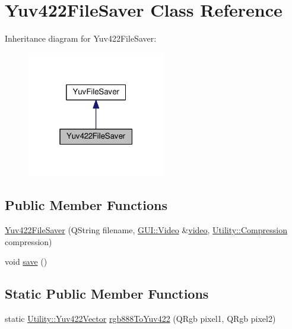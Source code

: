 \hypertarget{classUtility_1_1Yuv422FileSaver}{}\section{Yuv422\+File\+Saver Class Reference}
\label{classUtility_1_1Yuv422FileSaver}


Inheritance diagram for Yuv422\+File\+Saver\+:
\nopagebreak
\begin{figure}[H]
\begin{center}
\leavevmode
\includegraphics[width=171pt]{classUtility_1_1Yuv422FileSaver__inherit__graph}
\end{center}
\end{figure}
\subsection*{Public Member Functions}
\begin{DoxyCompactItemize}
\item 
\hyperlink{classUtility_1_1Yuv422FileSaver_a8028e1804a4e783e7935f005836bd11a}{Yuv422\+File\+Saver} (Q\+String filename, \hyperlink{classGUI_1_1Video}{G\+U\+I\+::\+Video} \&\hyperlink{classUtility_1_1YuvFileSaver_a1c4d4daa00ecea5e8390244e057da0df}{video}, \hyperlink{namespaceUtility_a56a83bf6847f4801f4205eb4be237ccf}{Utility\+::\+Compression} compression)
\item 
void \hyperlink{classUtility_1_1Yuv422FileSaver_aae2c382151ef7c9aa913361172b30db6}{save} ()
\end{DoxyCompactItemize}
\subsection*{Static Public Member Functions}
\begin{DoxyCompactItemize}
\item 
static \hyperlink{classUtility_1_1Yuv422Vector}{Utility\+::\+Yuv422\+Vector} \hyperlink{classUtility_1_1Yuv422FileSaver_a31a272c0c4297ae453507aff214e5e1e}{rgb888\+To\+Yuv422} (Q\+Rgb pixel1, Q\+Rgb pixel2)
\end{DoxyCompactItemize}
